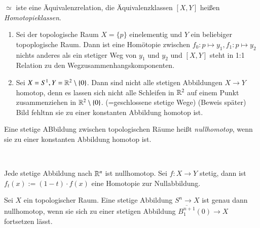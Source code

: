 \documentclass[a4paper,10pt]{scrartcl}
\begin{document}
$\simeq$ iste eine Äquivalenzrelation, die Äquivalenzklassen $[X,Y]$ heißen \emph{Homotopieklassen}.  
\begin{exs*}
 \begin{enumerate}
  \item Sei der topologische Raum $X=\{p\}$ einelementig und $Y$ ein beliebiger topoplogische Raum.  Dann ist eine Homötopie zwischen $f_0: p\mapsto y_1, f_1: p\mapsto y_2$ nichts anderes als ein stetiger Weg von $y_1$ und $y_2$ und $[X,Y]$ steht in 1:1 Relation zu den Wegzusammenhangskomponenten.
  \item Sei $X=S^1, Y=\mathbb{R}^2\setminus \{0\}$. Dann sind nicht alle stetigen Abbildungen $X\to Y$ homotop, denn es lassen sich nicht alle Schleifen in $\mathbb{R}^2$ auf einem Punkt zusammenziehen in $\mathbb{R}^2\setminus\{0\}$. (=geschlossene stetige Wege) (Beweis später)
\fixme[fig40]\\Bild fehltnn sie zu einer konstanten Abbildung homotop ist.  
\end{enumerate}
\end{exs*}
\begin{df}
 Eine stetige ABbildung zwischen topologischen Räume heißt \emph{nullhomotop}, wenn sie zu einer konstanten Abbildung homotop ist. 
\end{df}
\fixme[fig41]\\
\begin{ex*}
 Jede stetige Abbildung nach $\mathbb{R}^n$ ist nullhomotop. Sei $f: X\to Y$ stetig, dann ist $f_t(x):= (1-t)\cdot f(x)$ eine Homotopie zur Nullabbildung. 
\end{ex*}
\begin{st}
 Sei $X$ ein topologischer Raum.  Eine stetige Abbildung $S^n\to X$ ist genau dann nullhomotop, wenn sie sich zu einer stetigen Abbildung $\overline{B_1^{n+1}}(0)\to X$ fortsetzen lässt.
\end{st}
\end{document}
